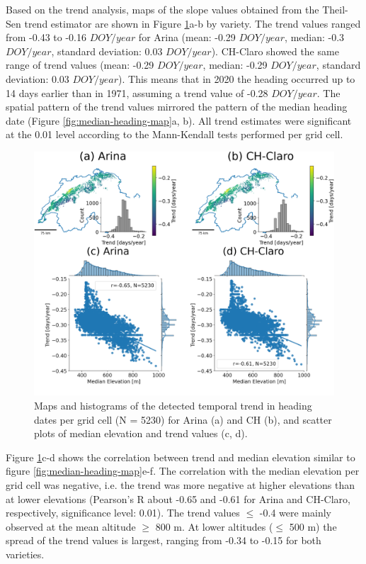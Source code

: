 Based on the trend analysis, maps of the slope values obtained from the Theil-Sen trend estimator are shown in Figure \ref{fig:map-temporal-trend}a-b by variety. The trend values ranged from -0.43 to -0.16 $DOY/year$ for Arina (mean: -0.29 $DOY/year$, median: -0.3 $DOY/year$, standard deviation: 0.03 $DOY/year$). CH-Claro showed the same range of trend values (mean: -0.29 $DOY/year$, median: -0.29 $DOY/year$, standard deviation: 0.03 $DOY/year$). This means that in 2020 the heading occurred up to 14 days earlier than in 1971, assuming a trend value of -0.28 $DOY/year$. The spatial pattern of the trend values mirrored the pattern of the median heading date (Figure \ref{fig:median-heading-map}a, b). All trend estimates were significant at the 0.01 level according to the Mann-Kendall tests performed per grid cell.

\begin{figure}[H]
    \centering
    \includegraphics[width=\textwidth]{03-Heading-Dates/img/climate_signal_combined.png}
    \caption{Maps and histograms of the detected temporal trend in heading dates per grid cell (N = 5230) for Arina (a) and CH (b), and scatter plots of median elevation and trend values (c, d).}
    \label{fig:map-temporal-trend}
\end{figure}

Figure \ref{fig:map-temporal-trend}c-d shows the correlation between trend and median elevation similar to figure \ref{fig:median-heading-map}e-f. The correlation with the median elevation per grid cell was negative, i.e. the trend was more negative at higher elevations than at lower elevations (Pearson's R about -0.65 and -0.61 for Arina and CH-Claro, respectively, significance level: 0.01). The trend values $\le$ -0.4 were mainly observed at the mean altitude $\ge$ 800 m. At lower altitudes ($\le$ 500 m) the spread of the trend values is largest, ranging from -0.34 to -0.15 for both varieties.


